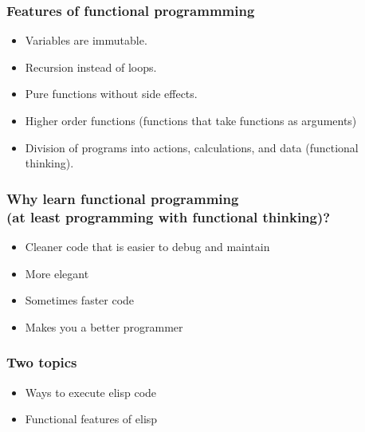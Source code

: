 \documentclass[aspectratio=169]{beamer}
\begin{document}
\begin{frame}
\frametitle{Features of functional programmming}
\Large{
\begin{itemize}[font=$\bullet$\scshape\bfseries]
\item Variables are immutable.
\item Recursion instead of loops.
\item Pure functions without side effects.
\item Higher order functions 
(functions that take functions as arguments) 
\item Division of programs into actions, calculations, and data (functional thinking).
\end{itemize}
}
\end{frame}




\begin{frame}
\frametitle{Why learn functional programming \\(at least programming with functional thinking)?}
\Large{
\begin{itemize}[font=$\bullet$\scshape\bfseries]
\item Cleaner code that is easier to debug and maintain
\item More elegant 
\item Sometimes faster code
\item Makes you a better programmer
\vspace{5mm}
\end{itemize}
}
\end{frame}



\begin{frame}
\frametitle{Two topics}
\Large{
\vspace{5mm}
\begin{itemize}[font=$\bullet$\scshape\bfseries]
\item Ways to execute elisp code 
\vspace{5mm}
\item Functional features of elisp
\end{itemize}
}
\end{frame}
\end{document}
